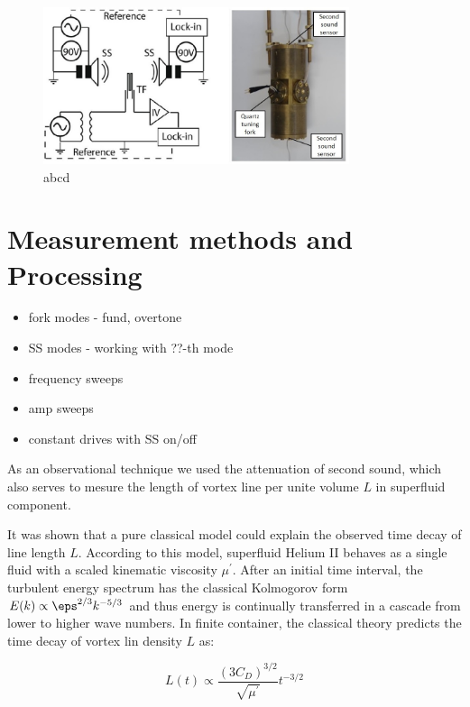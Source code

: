 \begin{figure}[h]
	\centering
	\includegraphics[width=0.8\textwidth]{graphics/exp/resonator}
	\caption{abcd}
\end{figure}


\section{Measurement methods and Processing}
\begin{itemize}
	\item fork modes - fund, overtone
	\item SS modes - working with ??-th mode
	\item frequency sweeps
	\item amp sweeps
	\item constant drives with SS on/off
\end{itemize}

As an observational technique we used the attenuation of second sound, which also serves to mesure the length of vortex line per unite volume $L$ in superfluid component.

It was shown that a pure classical model could explain the observed time decay of line length $L$. According to this model, superfluid Helium II behaves as a single fluid with a scaled
kinematic viscosity $\mu^{\prime}$. After an initial time interval, the turbulent energy spectrum has the classical Kolmogorov form $E(k) \propto \eps^{2/3} k^{-5/3}$ and thus energy is continually transferred in a cascade from lower to higher wave numbers. In finite container, the
classical theory predicts the time decay of vortex lin density $L$ as:

\begin{equation}
L(t) \propto \frac{(3C_D)^{3/2}}{\sqrt{\mu^{\prime}}} t^{-3/2}
\end{equation}

\newpage
